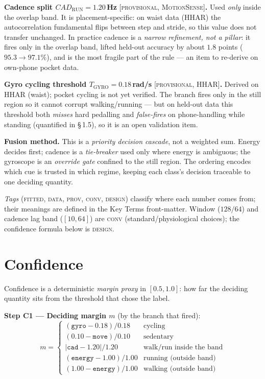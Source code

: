 \noindent\textbf{Cadence split $CAD_\text{RUN}=1.20$\,Hz} {\footnotesize\textsc{[provisional, MotionSense]}}\textbf{.}
Used \emph{only} inside the overlap band. It is placement-specific: on waist data (HHAR) the
autocorrelation fundamental flips between step and stride, so this value does not transfer
unchanged. In practice cadence is a \emph{narrow refinement, not a pillar}: it fires only in
the overlap band, lifted held-out accuracy by about $1.8$ points ($95.3\to97.1\%$), and is
the most fragile part of the rule --- an item to re-derive on own-phone pocket data.

\noindent\textbf{Gyro cycling threshold $T_\text{GYRO}=0.18$\,rad/s} {\footnotesize\textsc{[provisional, HHAR]}}\textbf{.}
Derived on HHAR (waist); pocket cycling is not yet verified. The branch fires only in the
still region so it cannot corrupt walking/running --- but on held-out data this threshold both
\emph{misses} hard pedalling and \emph{false-fires} on phone-handling while standing
(quantified in \S\,1.5), so it is an open validation item.

\noindent\textbf{Fusion method.}
This is a \emph{priority decision cascade}, not a weighted sum. Energy decides first;
cadence is a \emph{tie-breaker} used only where energy is ambiguous; the gyroscope is an
\emph{override gate} confined to the still region. The ordering encodes which cue is trusted
in which regime, keeping each class's decision traceable to one deciding quantity.

\noindent\emph{Tags} (\textsc{fitted}, \textsc{data}, \textsc{prov}, \textsc{conv},
\textsc{design}) classify where each number comes from; their meanings are defined in the Key
Terms front-matter. Window ($128/64$) and cadence lag band ($[10,64]$) are \textsc{conv}
(standard/physiological choices); the confidence formula below is \textsc{design}.

\section{Confidence}

Confidence is a deterministic \emph{margin proxy} in $[0.5,1.0]$: how far the deciding
quantity sits from the threshold that chose the label.

\noindent\textbf{Step C1 --- Deciding margin $m$} (by the branch that fired):
\[
m =
\begin{cases}
(\texttt{gyro}-0.18)/0.18 & \text{cycling}\\[2pt]
(0.10-\texttt{move})/0.10 & \text{sedentary}\\[2pt]
|\texttt{cad}-1.20|/1.20  & \text{walk/run inside the band}\\[2pt]
(\texttt{energy}-1.00)/1.00 & \text{running (outside band)}\\[2pt]
(1.00-\texttt{energy})/1.00 & \text{walking (outside band)}
\end{cases}
\]


